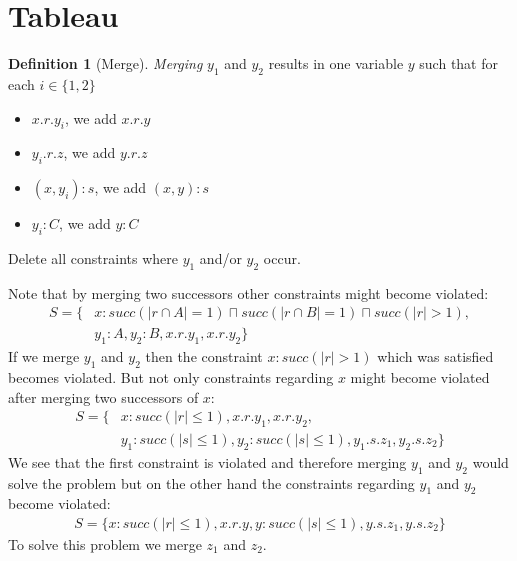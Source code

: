 \documentclass[a4paper,11pt]{scrartcl}
\theoremstyle{definition}
\newtheorem{mydef}{Definition}
\begin{document}
\section{Tableau}
\begin{mydef}[Merge]
\textit{Merging} $y_1$ and $y_2$ results in one variable $y$ such that for each $i\in\{1,2\}$
\begin{itemize}
\item $x.r.y_i$, we add $x.r.y$
\item $y_i.r.z$, we add $y.r.z$
\item $(x,y_i):s$, we add $(x,y):s$
\item $y_i:C$, we add $y:C$
\end{itemize}
Delete all constraints where $y_1$ and/or $y_2$ occur.
\end{mydef}
Note that by merging two successors other constraints might become violated:
\begin{align}
S=\{&x:succ(|r\cap A|=1)\sqcap succ(|r\cap B|=1)\sqcap succ(|r|>1),\nonumber\\ &y_1:A, y_2:B, x.r.y_1, x.r.y_2\}
\end{align}
If we merge $y_1$ and $y_2$ then the constraint $x:succ(|r|>1)$ which was satisfied becomes violated. But not only constraints regarding $x$ might become violated after merging two successors of $x$: 
\begin{align}
S=\{&x:succ(|r|\leq 1), x.r.y_1, x.r.y_2,\nonumber
\\&y_1:succ(|s|\leq 1), y_2:succ(|s|\leq 1), y_1.s.z_1, y_2.s.z_2\}
\end{align}
We see that the first constraint is violated and therefore merging $y_1$ and $y_2$ would solve the problem but on the other hand the constraints regarding $y_1$ and $y_2$ become violated: 
\begin{align}
S=\{x:succ(|r|\leq 1), x.r.y,
y:succ(|s|\leq 1), y.s.z_1, y.s.z_2\}
\end{align}
To solve this problem we merge $z_1$ and $z_2$.
\end{document}
